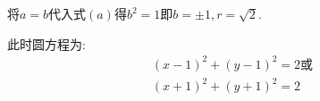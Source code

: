 \begin{questions}
\begin{solution}
\begin{enumerate}[label=(\arabic*)]
			      将$a=b$代入式$(a)$得$b^2 = 1$即$b=\pm1, r=\sqrt{2}$.

			      此时圆方程为:
			      \begin{align*}
				      (x-1)^2 + (y-1)^2 = 2 \text{或} \\
				      (x+1)^2 + (y+1)^2 = 2
			      \end{align*}
		\end{enumerate}
	\end{solution}

\end{questions}
